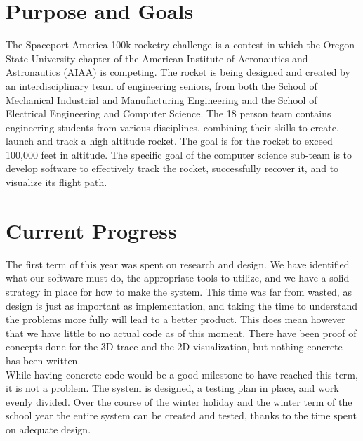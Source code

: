 \documentclass[onecolumn, draftclsnofoot,10pt, compsoc]{IEEEtran}
\begin{document}
\section {Purpose and Goals}
The Spaceport America 100k rocketry challenge is a contest in which the Oregon State University chapter of the American Institute of Aeronautics and Astronautics (AIAA) is competing. The rocket is being designed and created by an interdisciplinary team of engineering seniors, from both the School of Mechanical Industrial and Manufacturing Engineering and the School of Electrical Engineering and Computer Science. The 18 person team contains engineering students from various disciplines, combining their skills to create, launch and track a high altitude rocket. The goal is for the rocket to exceed 100,000 feet in altitude. The specific goal of the computer science sub-team is to develop software to effectively track the rocket, successfully recover it, and to visualize its flight path. \par
\section {Current Progress} 
The first term of this year was spent on research and design. We have identified what our software must do, the appropriate tools to utilize, and we have a solid strategy in place for how to make the system. This time was far from wasted, as design is just as important as implementation, and taking the time to understand the problems more fully will lead to a better product. This does mean however that we have little to no actual code as of this moment. There have been proof of concepts done for the 3D trace and the 2D visualization, but nothing concrete has been written. \\
While having concrete code would be a good milestone to have reached this term, it is not a problem. The system is designed, a testing plan in place, and work evenly divided. Over the course of the winter holiday and the winter term of the school year the entire system can be created and tested, thanks to the time spent on adequate design. \par
\end{document}
